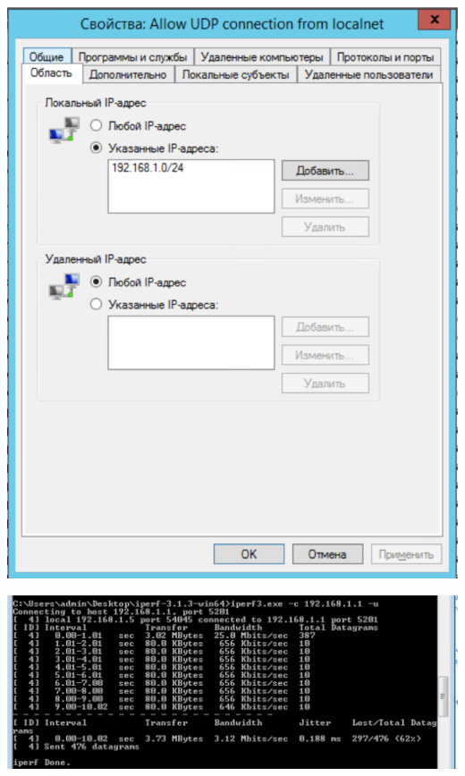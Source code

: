 \documentclass[a4paper,14pt]{extarticle}
\begin{document}
    \begin{center}
        \includegraphics[scale=0.7]{7.3.2.png}
    \end{center}

    \begin{center}
        \includegraphics[scale=0.8]{7.3.3.png}
    \end{center}
\end{document}

